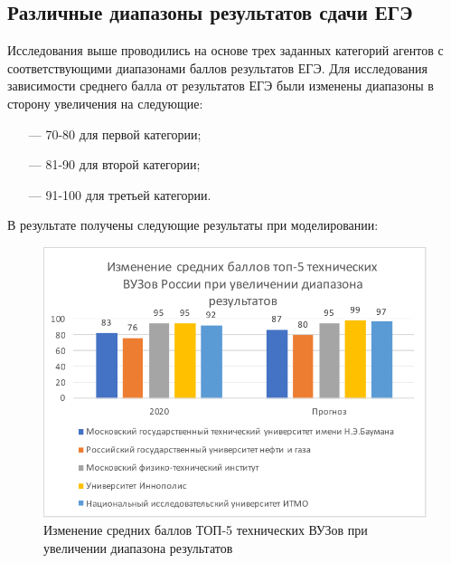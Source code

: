 \subsection{Различные диапазоны результатов сдачи ЕГЭ}

Исследования выше проводились на основе трех заданных категорий агентов с соответствующими диапазонами баллов результатов ЕГЭ. Для исследования зависимости среднего балла от результатов ЕГЭ были изменены диапазоны в сторону увеличения на следующие:

\begin{itemize}[leftmargin=1.6\parindent]
	\item[---] 70-80 для первой категории;
	\item[---] 81-90 для второй категории;
	\item[---] 91-100 для третьей категории.
\end{itemize}

В результате получены следующие результаты при моделировании:

\begin{figure}[hbtp]
	\centering
	\includegraphics[scale=1.0]{img/top5techdur.pdf.pdf}
	\caption{Изменение средних баллов ТОП-5 технических ВУЗов при увеличении диапазона результатов}
	\label{top5techdur}
\end{figure} 

